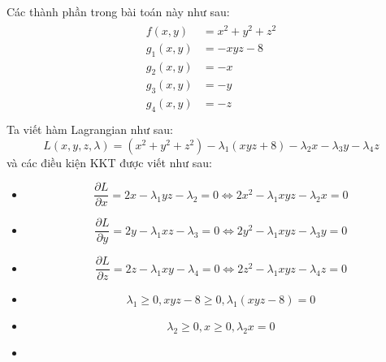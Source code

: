 \begin{solution}

    Các thành phần trong bài toán này như sau:
    \begin{align}
        \begin{aligned}
            f(x,y) &= x^2 + y^2 + z^2\\
            g_1(x,y) &= - xyz - 8\\
            g_2(x, y) &= -x\\
            g_3(x, y) &= -y\\
            g_4(x, y) &= -z\\
        \end{aligned}
    \end{align}
    Ta viết hàm Lagrangian như sau:
    \begin{equation}
        L(x, y, z, \lambda) = (x^2 + y^2 + z^2) - \lambda_1(xyz + 8) - \lambda_2x - \lambda_3y - \lambda_4z
    \end{equation}
    và các điều kiện KKT được viết như sau:
    \begin{itemize}
        \item \begin{equation}
            \dfrac{\partial L}{\partial x} = 2x - \lambda_1yz - \lambda_2 = 0 \Leftrightarrow 2x^2 - \lambda_1xyz - \lambda_2x = 0
        \end{equation}
        \item \begin{equation}
            \dfrac{\partial L}{\partial y} = 2y - \lambda_1xz - \lambda_3 = 0 \Leftrightarrow 2y^2 - \lambda_1xyz - \lambda_3y = 0
        \end{equation}
        \item \begin{equation}
            \dfrac{\partial L}{\partial z} = 2z - \lambda_1xy - \lambda_4 = 0 \Leftrightarrow 2z^2 - \lambda_1xyz - \lambda_4z = 0
        \end{equation}
        \item \begin{equation}
            \lambda_1 \geq 0, xyz - 8 \geq 0, \lambda_1(xyz - 8) = 0
        \end{equation}
        \item \begin{equation}
            \lambda_2 \geq 0, x \geq 0, \lambda_2x = 0
        \end{equation}
        \item \begin{equation}

\end{equation}
\end{itemize}
\end{solution}

